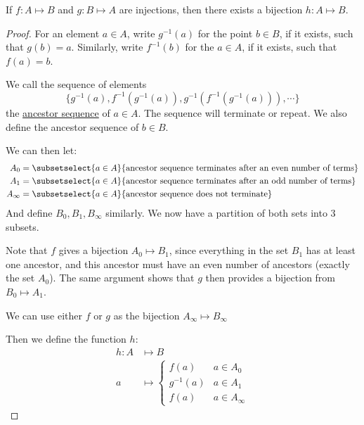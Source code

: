 \documentclass[../Main.tex]{subfiles}
\begin{document}
\begin{theorem}
    \label{thmSchroderBernstein}
    If $f : A \mapsto B$ and $g : B \mapsto A$ are injections, then there exists a bijection $h : A \mapsto B$.
\end{theorem}
\begin{proof}
    For an element $a \in A$, write $g^{-1}(a)$ for the point $b \in B$, if it exists, such that $g(b) = a$. Similarly, write $f^{-1}(b)$ for the $a \in A$, if it exists, such that $f(a) = b$.\par
    We call the sequence of elements 
    \begin{equation*}
        \{g^{-1}(a), f^{-1}(g^{-1}(a)), g^{-1}(f^{-1}(g^{-1}(a))), \cdots\}
    \end{equation*}
    the \underline{ancestor sequence} of $a \in A$. The sequence will terminate or repeat. We also define the ancestor sequence of $b \in B$.\par
    We can then let:
    \begin{align*}
        A_0 &= \subsetselect{a \in A}{\text{ancestor sequence terminates after an even number of terms}} \\
        A_1 &= \subsetselect{a \in A}{\text{ancestor sequence terminates after an odd number of terms}} \\
        A_\infty &= \subsetselect{a \in A}{\text{ancestor sequence does not terminate}}
    \end{align*}
    And define $B_0, B_1, B_\infty$ similarly. We now have a partition of both sets into 3 subsets.\par
    Note that $f$ gives a bijection $A_0 \mapsto B_1$, since everything in the set $B_1$ has at least one ancestor, and this ancestor must have an even number of ancestors (exactly the set $A_0$). The same argument shows that $g$ then provides a bijection from $B_0 \mapsto A_1$.\par
    We can use either $f$ or $g$ as the bijection $A_\infty \mapsto B_\infty$\par
    Then we define the function $h$:
    \begin{align*}
        h : A &\mapsto B \\
        a &\mapsto
        \begin{cases}
            f(a) & a \in A_0 \\
            g^{-1}(a) & a \in A_1 \\
            f(a) & a \in A_\infty
        \end{cases}
    \end{align*}
\end{proof}
\end{document}
